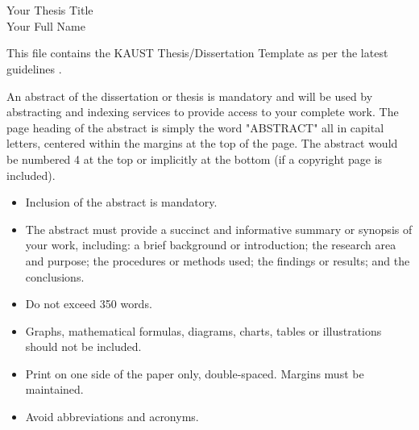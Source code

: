 

\chapter*{}

\doublespacing

\begin{center}
\Large {Your Thesis Title\\
Your Full Name}
\end{center}

This file contains the KAUST Thesis/Dissertation Template as per the latest guidelines \cite{guidelines}.

An abstract of the dissertation or thesis is mandatory and will be used by abstracting and indexing services to provide access to your complete work. The page heading of the abstract is simply the word "ABSTRACT" all in capital letters, centered within the margins at the top of the page. The abstract would be numbered 4 at the top or implicitly at the bottom (if a copyright page is included).

\begin{itemize}
\item Inclusion of the abstract is mandatory.
\item	The abstract must provide a succinct and informative summary or synopsis of your work, including: a brief background or introduction; the research area and purpose; the procedures or methods used; the findings or results; and the conclusions.
\item	Do not exceed 350 words.
\item	Graphs, mathematical formulas, diagrams, charts, tables or illustrations should not be included. 
\item	Print on one side of the paper only, double-spaced.  Margins must be maintained. 
\item	Avoid abbreviations and acronyms.

\end{itemize}

